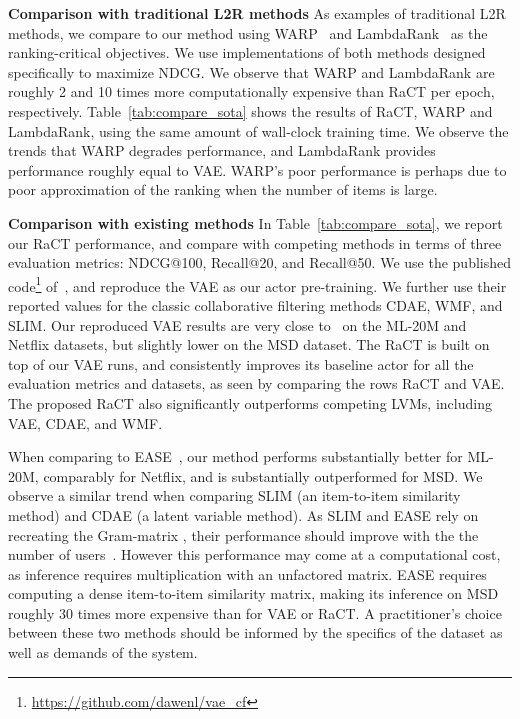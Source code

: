 \documentclass{article} \usepackage{iclr2020_conference,times}
\begin{document}
{\bf Comparison with traditional L2R methods}
As examples of traditional L2R methods, we compare to our method using WARP~\citep{weston2011wsabie} and LambdaRank~\citep{burges2007learning} as the ranking-critical objectives. We use implementations of both methods designed specifically to maximize NDCG. We observe that WARP and LambdaRank are roughly 2 and 10 times more computationally expensive than RaCT per epoch, respectively. Table~\ref{tab:compare_sota} shows the results of RaCT, WARP and LambdaRank, using the same amount of wall-clock training time. We observe the trends that WARP degrades performance, and LambdaRank provides performance roughly equal to VAE. WARP's poor performance is perhaps due to poor approximation of the ranking when the number of items is large.









{\bf Comparison with existing methods}
In Table~\ref{tab:compare_sota}, we report our RaCT performance, and compare with competing methods in terms of three evaluation metrics: NDCG@100, Recall@20, and Recall@50. 
We use the published code\footnote{\url{https://github.com/dawenl/vae_cf}} of~\citet{liang2018variational}, and reproduce the VAE as our actor pre-training. We further use their reported values for the classic collaborative filtering methods CDAE, WMF, and SLIM.
Our reproduced VAE results are very close to~\citet{liang2018variational} on the ML-20M and Netflix datasets, but slightly lower on the MSD dataset. The RaCT is built on top of our VAE runs, and consistently improves its baseline actor for all the evaluation metrics and datasets, as seen by comparing the rows RaCT and VAE.
The proposed RaCT also significantly outperforms competing LVMs, including VAE, CDAE, and WMF.

When comparing to EASE~\citep{steck2019ease}, our method performs substantially better for ML-20M, comparably for Netflix, and is substantially outperformed for MSD. We observe a similar trend when comparing SLIM (an item-to-item similarity method) and CDAE (a latent variable method).
As SLIM and EASE rely on recreating the Gram-matrix , their performance should improve with the the number of users~\citep{steck2019ease}. However this performance may come at a computational cost, as inference requires multiplication with an unfactored  matrix. EASE requires computing a dense item-to-item similarity matrix, making its inference on MSD roughly 30 times more expensive than for VAE or RaCT. A practitioner's choice between these two methods should be informed by the specifics of the dataset as well as demands of the system.
\end{document}
